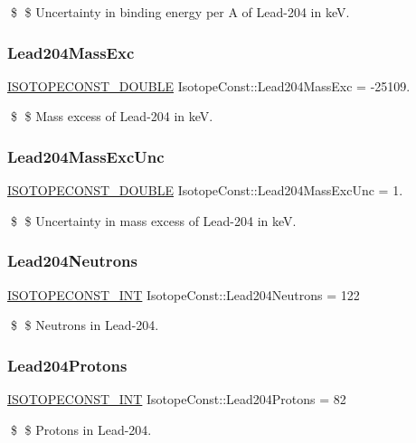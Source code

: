 \$ \$ Uncertainty in binding energy per A of Lead-\/204 in keV. \mbox{\label{group___isotope_const-_lead-_pb204_gaa580e2249af7248d86385de01b31b6d3}} 
\subsubsection{\texorpdfstring{Lead204\+Mass\+Exc}{Lead204MassExc}}
{\footnotesize\ttfamily \mbox{\hyperlink{group___isotope_const-_macros_ga8f45a7272ce02c0b4c65c44636ed719a}{I\+S\+O\+T\+O\+P\+E\+C\+O\+N\+S\+T\+\_\+\+D\+O\+U\+B\+LE}} Isotope\+Const\+::\+Lead204\+Mass\+Exc = -\/25109.}

\$ \$ Mass excess of Lead-\/204 in keV. \mbox{\label{group___isotope_const-_lead-_pb204_ga84f2af8709e279742117f14125f1b732}} 
\subsubsection{\texorpdfstring{Lead204\+Mass\+Exc\+Unc}{Lead204MassExcUnc}}
{\footnotesize\ttfamily \mbox{\hyperlink{group___isotope_const-_macros_ga8f45a7272ce02c0b4c65c44636ed719a}{I\+S\+O\+T\+O\+P\+E\+C\+O\+N\+S\+T\+\_\+\+D\+O\+U\+B\+LE}} Isotope\+Const\+::\+Lead204\+Mass\+Exc\+Unc = 1.}

\$ \$ Uncertainty in mass excess of Lead-\/204 in keV. \mbox{\label{group___isotope_const-_lead-_pb204_ga1ac4bdbda688f50b3785122915bc8249}} 
\subsubsection{\texorpdfstring{Lead204\+Neutrons}{Lead204Neutrons}}
{\footnotesize\ttfamily \mbox{\hyperlink{group___isotope_const-_macros_ga5f18360b3e99483a35c32d789e62621c}{I\+S\+O\+T\+O\+P\+E\+C\+O\+N\+S\+T\+\_\+\+I\+NT}} Isotope\+Const\+::\+Lead204\+Neutrons = 122}

\$ \$ Neutrons in Lead-\/204. \mbox{\label{group___isotope_const-_lead-_pb204_ga34cc7931adf9d1eb1bb73f87ab44d95f}} 
\subsubsection{\texorpdfstring{Lead204\+Protons}{Lead204Protons}}
{\footnotesize\ttfamily \mbox{\hyperlink{group___isotope_const-_macros_ga5f18360b3e99483a35c32d789e62621c}{I\+S\+O\+T\+O\+P\+E\+C\+O\+N\+S\+T\+\_\+\+I\+NT}} Isotope\+Const\+::\+Lead204\+Protons = 82}

\$ \$ Protons in Lead-\/204. 
